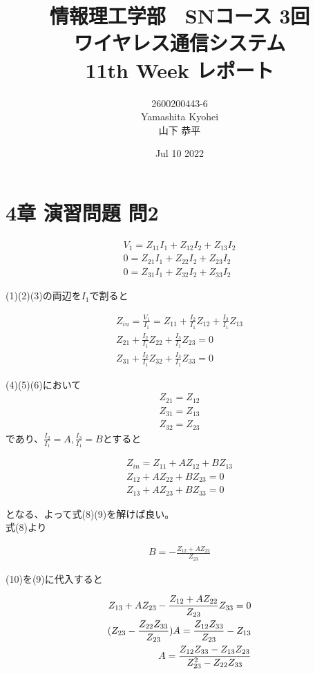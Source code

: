 \documentclass[dvipdfmx,autodetect-engine,titlepage]{jsarticle}
\title{情報理工学部　SNコース 3回\\
ワイヤレス通信システム\\
11th Week レポート}
\author{2600200443-6\\Yamashita Kyohei\\山下 恭平}
\date{Jul 10 2022}
\begin{document}
\maketitle

\section{4章 演習問題 問2}

\begin{align}
  V_1 = Z_{11}I_1 + Z_{12}I_2 + Z_{13}I_2 \\
  0 = Z_{21}I_1 + Z_{22}I_2 + Z_{23}I_2 \\
  0 = Z_{31}I_1 + Z_{32}I_2 + Z_{33}I_2 
\end{align}

(1)(2)(3)の両辺を\begin{math} I_1\end{math}で割ると

\begin{align}
  Z_{in} = \frac{V_1}{I_1} = Z_{11} + \frac{I_2}{I_1}Z_{12} + \frac{I_3}{I_1}Z_{13}\\
  Z_{21} + \frac{I_2}{I_1}Z_{22} + \frac{I_3}{I_1}Z_{23} = 0\\
  Z_{31} + \frac{I_2}{I_1}Z_{32} + \frac{I_3}{I_1}Z_{33} = 0
\end{align}

(4)(5)(6)において
\begin{align*}
  Z_{21} = Z_{12}\\
  Z_{31} = Z_{13}\\
  Z_{32} = Z_{23}
\end{align*}
であり、\begin{math}\frac{I_2}{I_1} = A , \frac{I_3}{I_1} = B\end{math}とすると

\begin{align}
  Z_{in} = Z_{11} + AZ_{12} + BZ_{13}\\
  Z_{12} + AZ_{22} + BZ_{23} = 0\\
  Z_{13} + AZ_{23} + BZ_{33} = 0
\end{align}

となる、よって式(8)(9)を解けば良い。\\
式(8)より

\begin{align}
  B = - \frac{Z_{12} + AZ_{22}}{Z_{23}}
\end{align}

(10)を(9)に代入すると

\begin{align}
  Z_{13} + AZ_{23} - \frac{Z_{12} + AZ_{22}}{Z_{23}}Z_{33} = 0\notag\\ 
  (Z_{23} - \frac{Z_{22}Z_{33}}{Z_{23}})A = \frac{Z_{12}Z_{33}}{Z_{23}} - Z_{13}\notag\\
  A = \frac{Z_{12}Z_{33}-Z_{13}Z_{23}}{Z_{23}^2-Z_{22}Z_{33}}
\end{align}
\end{document}

